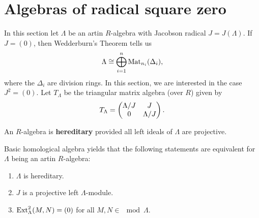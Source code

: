 
\section{Algebras of radical square zero}\label{3.5}


In this section let $\Lambda$ be an artin $R$-algebra with Jacobson radical $J=J(\Lambda)$. If $J = (0)$, then Wedderburn's Theorem
tells us
\[
\Lambda \cong \bigoplus_{i=1}^n \operatorname{Mat}_{n_i}(\Delta_i),
\]
where the $\Delta_i$ are division rings. In this section, we are interested in the case $J^2 = (0)$. Let $T_\Lambda$ be the triangular matrix algebra (over $R$) given by
\[
T_\Lambda
=
\begin{pmatrix}
\Lambda/J & J \\
0 & \Lambda/J
\end{pmatrix}.
\]


\begin{definition}
An $R$-algebra is \textbf{hereditary} provided all left ideals of $\Lambda$ are projective.
\end{definition}


\begin{remark}
Basic homological algebra yields that the following statements are equivalent for $\Lambda$ being an artin $R$-algebra:
\begin{enumerate}[label=(\roman*)]
\item $\Lambda$ is hereditary.
\item $J$ is a projective left $\Lambda$-module.
\item $\operatorname{Ext}_\Lambda^2(M,N) = (0)$ for all $M, N \in \mod \Lambda$.
\end{enumerate}
\end{remark}


